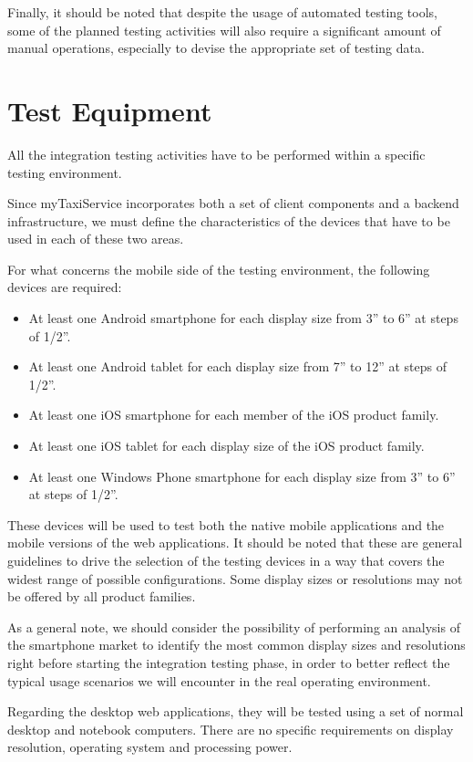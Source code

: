 Finally, it should be noted that despite the usage of automated testing tools, some of the planned testing activities will also require a significant amount of manual operations, especially to devise the appropriate set of testing data.

\section{Test Equipment}
All the integration testing activities have to be performed within a specific testing environment. 

Since myTaxiService incorporates both a set of client components and a backend infrastructure, we must define the characteristics of the devices that have to be used in each of these two areas.

For what concerns the mobile side of the testing environment, the following devices are required:
\begin{itemize}
	\item At least one Android smartphone for each display size from 3” to 6” at steps of 1/2”.
	\item At least one Android tablet for each display size from 7” to 12” at steps of 1/2”. 
	\item At least one iOS smartphone for each member of the iOS product family.
	\item At least one iOS tablet for each display size of the iOS product family.
	\item At least one Windows Phone smartphone for each display size from 3” to 6” at steps of 1/2”. 
\end{itemize}
These devices will be used to test both the native mobile applications and the mobile versions of the web applications.
It should be noted that these are general guidelines to drive the selection of the testing devices in a way that covers the widest range of possible configurations. Some display sizes or resolutions may not be offered by all product families. 

As a general note, we should consider the possibility of performing an analysis of the smartphone market to identify the most common display sizes and resolutions right before starting the integration testing phase, in order to better reflect the typical usage scenarios we will encounter in the real operating environment. 

Regarding the desktop web applications, they will be tested using a set of normal desktop and notebook computers. There are no specific requirements on display resolution, operating system and processing power.


